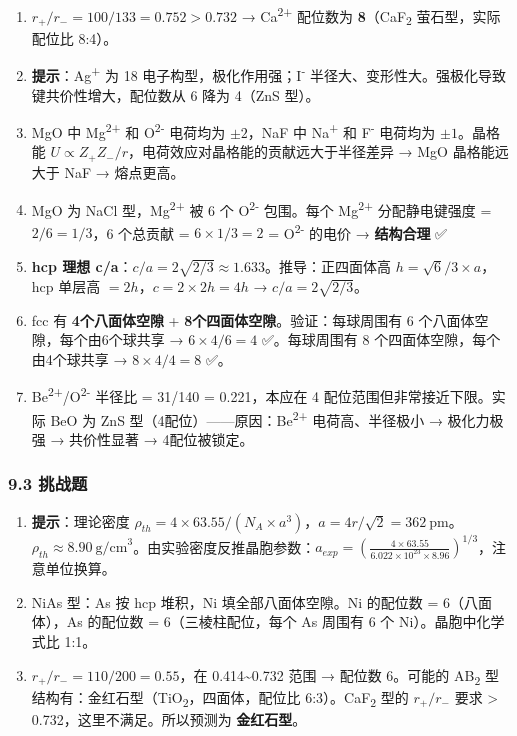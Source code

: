 \documentclass[a4paper,11pt]{ctexart}
\begin{document}
\begin{enumerate}
\def\labelenumi{\arabic{enumi}.}
\setcounter{enumi}{5}
\item
  \(r_+/r_- = 100/133 = 0.752 > 0.732\) → Ca\textsuperscript{2+} 配位数为 \textbf{8}（CaF\textsubscript{2} 萤石型，实际配位比 8:4）。
\item
  \textbf{提示}：Ag\textsuperscript{+} 为 18 电子构型，极化作用强；I\textsuperscript{-} 半径大、变形性大。强极化导致键共价性增大，配位数从 6 降为 4（ZnS 型）。
\item
  MgO 中 Mg\textsuperscript{2+} 和 O\textsuperscript{2-} 电荷均为 \(\pm2\)，NaF 中 Na\textsuperscript{+} 和 F\textsuperscript{-} 电荷均为 \(\pm1\)。晶格能 \(U \propto Z_+Z_-/r\)，电荷效应对晶格能的贡献远大于半径差异 → MgO 晶格能远大于 NaF → 熔点更高。
\item
  MgO 为 NaCl 型，Mg\textsuperscript{2+} 被 6 个 O\textsuperscript{2-} 包围。每个 Mg\textsuperscript{2+} 分配静电键强度 = \(2/6 = 1/3\)，6 个总贡献 = \(6 \times 1/3 = 2\) = O\textsuperscript{2-} 的电价 → \textbf{结构合理} ✅
\item
  \textbf{hcp 理想 c/a}：\(c/a = 2\sqrt{2/3} \approx 1.633\)。推导：正四面体高 \(h = \sqrt{6}/3 \times a\)，hcp 单层高 \(= 2h\)，\(c = 2 \times 2h = 4h\) → \(c/a = 2\sqrt{2/3}\)。
\item
  fcc 有 \textbf{4个八面体空隙} + \textbf{8个四面体空隙}。验证：每球周围有 6 个八面体空隙，每个由6个球共享 → \(6 \times 4 / 6 = 4\) ✅。每球周围有 8 个四面体空隙，每个由4个球共享 → \(8 \times 4 / 4 = 8\) ✅。
\item
  Be\textsuperscript{2+}/O\textsuperscript{2-} 半径比 = 31/140 = 0.221，本应在 4 配位范围但非常接近下限。实际 BeO 为 ZnS 型（4配位）------原因：Be\textsuperscript{2+} 电荷高、半径极小 → 极化力极强 → 共价性显著 → 4配位被锁定。
\end{enumerate}

\subsubsection{9.3 挑战题}\label{ux6311ux6218ux9898-1}

\begin{enumerate}
\def\labelenumi{\arabic{enumi}.}
\setcounter{enumi}{12}
\item
  \textbf{提示}：理论密度 \(\rho_{th} = 4 \times 63.55 / (N_A \times a^3)\)，\(a = 4r/\sqrt{2} = 362\ \mathrm{pm}\)。\(\rho_{th} \approx 8.90\ \mathrm{g/cm}^3\)。由实验密度反推晶胞参数：\(a_{exp} = \left(\frac{4 \times 63.55}{6.022 \times 10^{23} \times 8.96}\right)^{1/3}\)，注意单位换算。
\item
  NiAs 型：As 按 hcp 堆积，Ni 填全部八面体空隙。Ni 的配位数 = 6（八面体），As 的配位数 = 6（三棱柱配位，每个 As 周围有 6 个 Ni）。晶胞中化学式比 1:1。
\item
  \(r_+/r_- = 110/200 = 0.55\)，在 0.414\textasciitilde0.732 范围 → 配位数 6。可能的 AB\textsubscript{2} 型结构有：金红石型（TiO\textsubscript{2}，四面体，配位比 6:3）。CaF\textsubscript{2} 型的 \(r_+/r_-\) 要求 \textgreater{} 0.732，这里不满足。所以预测为 \textbf{金红石型}。
\end{enumerate}
\end{document}
